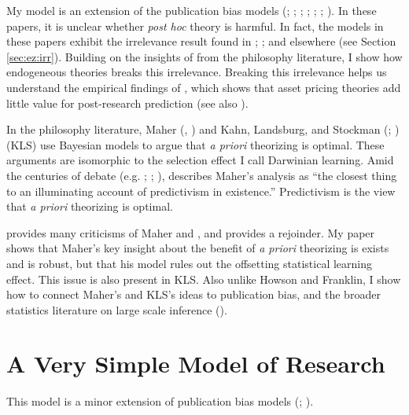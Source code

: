 \documentclass[12pt,english]{article}
\theoremstyle{plain}
\theoremstyle{plain}
\begin{document}
My model is an extension of the publication bias models (\citet{hedges1984estimation}; \citet{brodeur2016star}; \citet{andrews2019identification}; \citet{abadie2020statistical}; \citet{chen2020publication}; \citet{jensen2023there}; \citet{kasy2024optimal}). In these papers, it is unclear whether \emph{post hoc} theory is harmful. In fact, the models in these papers exhibit the irrelevance result found in \citet{hempel1966philosophy}; \citet{lakatos1970methodology}; and elsewhere (see Section \ref{sec:ez:irr}). Building on the insights of from the philosophy literature, I show how endogeneous theories breaks this irrelevance. Breaking this irrelevance helps us understand the empirical findings of \citet{chen2024does}, which shows that asset pricing theories add little value for post-research prediction (see also \citet{chen2023high}).


In the philosophy literature, Maher (\citeyear{maher1988prediction}, \citeyear{maher1990prediction}) and Kahn, Landsburg, and Stockman (\citeyear{kahn1992novel}; \citeyear{kahn1996positive}) (KLS) use Bayesian models to argue that \emph{a priori} theorizing is optimal. These arguments are isomorphic to the selection effect I call Darwinian learning. Amid the centuries of  debate  (e.g. \citet{leibniz1678letter}; \citet{newton1726scholium}; \citet{keynes1921treatise}), \citet{barnes1996discussion} describes Maher's analysis as ``the closest thing to an illuminating account of predictivism in existence.'' Predictivism is the view that \emph{a priori} theorizing is optimal.

\citet{howson1991maher} provides many criticisms of Maher \citeyearpar{maher1988prediction} and \citeyearpar{maher1990prediction}, and  \citet{maher1993discussion} provides a rejoinder.  My paper shows that Maher's key insight about the benefit of \emph{a priori} theorizing is exists and is robust, but that his model rules out the offsetting statistical learning effect. This issue is also present in KLS.  Also unlike Howson and Franklin, I show how to connect Maher's and KLS's ideas to publication bias, and the broader statistics literature on large scale inference  (\citet{efron2012large}).





\section{A Very Simple Model of Research}\label{sec:ez}

This model is a minor extension of publication bias models (\citet{andrews2019identification}; \citet{chen2020publication}).
\end{document}
